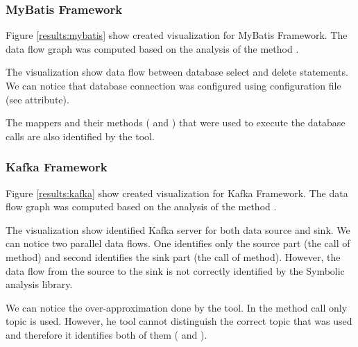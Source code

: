 \subsubsection{MyBatis Framework}

Figure \ref{results:mybatis} show created visualization for MyBatis Framework.
The data flow graph was computed based on the analysis of the method\break
{}. 

The visualization show data flow between database select and delete statements.
We can notice that database connection was configured using
configuration file (see  attribute).

The mappers and their methods (\break
and )
that were used to execute the database calls are also identified by the \ToolName tool.




\subsubsection{Kafka Framework}

Figure \ref{results:kafka} show created visualization for Kafka Framework.
The data flow graph was computed based on the analysis of the method\break
{}.

The visualization show identified Kafka server for both data source and sink.
We can notice two parallel data flows.
One identifies only the source part (the call of  method)
and second identifies the sink part (the call of  method).
However, the data flow from the source to the sink is 
not correctly identified by the Symbolic analysis library.

We can notice the over-approximation done by the \ToolName tool.
In the  method call only topic  is used.
However, he tool cannot distinguish the correct topic that was used
and therefore it identifies both of them ( and ).



